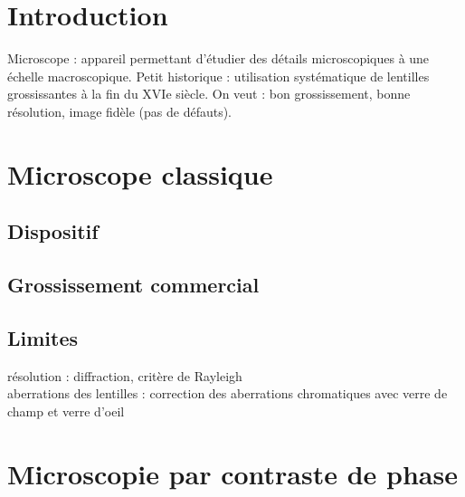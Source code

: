 


\biblio{}

\section*{Introduction}
Microscope : appareil permettant d’étudier des détails microscopiques à une échelle macroscopique.
Petit historique : utilisation systématique de lentilles grossissantes à la fin du XVIe siècle. On veut : bon grossissement, bonne résolution, image fidèle (pas de défauts).

\section{Microscope classique}
\subsection{Dispositif}
\subsection{Grossissement commercial}

\subsection{Limites}
résolution : diffraction, critère de Rayleigh \\
aberrations des lentilles : correction des aberrations chromatiques avec verre de champ et verre d’oeil  


\section{Microscopie par contraste de phase}

